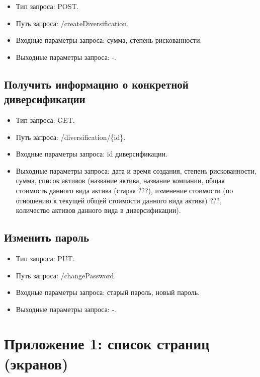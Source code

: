 \documentclass[a4paper, 14pt]{article}
\begin{document}
\begin{itemize}
    \item Тип запроса: POST.
    \item Путь запроса: /createDiversification.
    \item Входные параметры запроса: сумма, степень рискованности.
    \item Выходные параметры запроса: -.
\end{itemize}

\subsection{Получить информацию о конкретной диверсификации}

\begin{itemize}
    \item Тип запроса: GET.
    \item Путь запроса: /diversification/\{id\}.
    \item Входные параметры запроса: id диверсификации.
    \item Выходные параметры запроса: дата и время создания, степень рискованности, сумма, список активов (название актива, название компании, общая стоимость данного вида актива (старая ???), изменение стоимости (по отношению к текущей общей стоимости данного вида актива) ???, количество активов данного вида в диверсификации).
\end{itemize}

\subsection{Изменить пароль}

\begin{itemize}
    \item Тип запроса: PUT.
    \item Путь запроса: /changePassword.
    \item Входные параметры запроса: старый пароль, новый пароль.
    \item Выходные параметры запроса: -.
\end{itemize}

\newpage
\section{Приложение 1: список страниц (экранов)}
\end{document}
